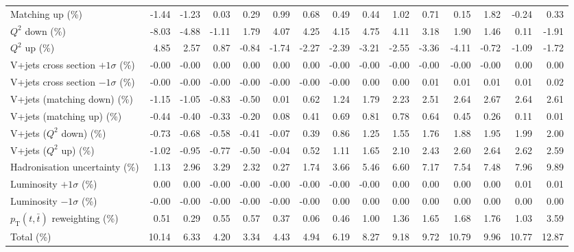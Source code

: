 \begin{table}[htbp]
{\begin{tabular}{lrrrrrrrrrrrrrr}
Matching up (\%) & -1.44 & -1.23 & 0.03 & 0.29 & 0.99 & 0.68 & 0.49 & 0.44 & 1.02 & 0.71 & 0.15 & 1.82 & -0.24 & 0.33 \\ 
$Q^{2}$ down (\%) & -8.03 & -4.88 & -1.11 & 1.79 & 4.07 & 4.25 & 4.15 & 4.75 & 4.11 & 3.18 & 1.90 & 1.46 & 0.11 & -1.91 \\ 
$Q^{2}$ up (\%) & 4.85 & 2.57 & 0.87 & -0.84 & -1.74 & -2.27 & -2.39 & -3.21 & -2.55 & -3.36 & -4.11 & -0.72 & -1.09 & -1.72 \\ 
V+jets cross section \ensuremath{+1\sigma} (\%) & -0.00 & -0.00 & 0.00 & 0.00 & 0.00 & 0.00 & -0.00 & -0.00 & -0.00 & -0.00 & -0.00 & -0.00 & 0.00 & 0.00 \\ 
V+jets cross section \ensuremath{-1\sigma} (\%) & -0.00 & -0.00 & -0.00 & -0.00 & -0.00 & -0.00 & -0.00 & 0.00 & 0.00 & 0.01 & 0.01 & 0.01 & 0.01 & 0.02 \\ 
V+jets (matching down) (\%) & -1.15 & -1.05 & -0.83 & -0.50 & 0.01 & 0.62 & 1.24 & 1.79 & 2.23 & 2.51 & 2.64 & 2.67 & 2.64 & 2.61 \\ 
V+jets (matching up) (\%) & -0.44 & -0.40 & -0.33 & -0.20 & 0.08 & 0.41 & 0.69 & 0.81 & 0.78 & 0.64 & 0.45 & 0.26 & 0.11 & 0.01 \\ 
V+jets ($Q^{2}$ down) (\%) & -0.73 & -0.68 & -0.58 & -0.41 & -0.07 & 0.39 & 0.86 & 1.25 & 1.55 & 1.76 & 1.88 & 1.95 & 1.99 & 2.00 \\ 
V+jets ($Q^{2}$ up) (\%) & -1.02 & -0.95 & -0.77 & -0.50 & -0.04 & 0.52 & 1.11 & 1.65 & 2.10 & 2.43 & 2.60 & 2.64 & 2.62 & 2.59 \\ 
Hadronisation uncertainty (\%) & 1.13 & 2.96 & 3.29 & 2.32 & 0.27 & 1.74 & 3.66 & 5.46 & 6.60 & 7.17 & 7.54 & 7.48 & 7.96 & 9.89 \\ 
Luminosity $+1\sigma$ (\%) & 0.00 & 0.00 & -0.00 & -0.00 & -0.00 & -0.00 & -0.00 & -0.00 & 0.00 & 0.00 & 0.00 & 0.00 & 0.01 & 0.01 \\ 
Luminosity $-1\sigma$ (\%) & -0.00 & -0.00 & -0.00 & -0.00 & -0.00 & -0.00 & 0.00 & 0.00 & 0.00 & 0.00 & 0.00 & 0.00 & 0.00 & 0.00 \\ 
$p_\mathrm{T}(t,\bar{t})$ reweighting (\%) & 0.51 & 0.29 & 0.55 & 0.57 & 0.37 & 0.06 & 0.46 & 1.00 & 1.36 & 1.65 & 1.68 & 1.76 & 1.03 & 3.59 \\ 
\hline 
Total (\%) & 10.14  & 6.33  & 4.20  & 3.34  & 4.43  & 4.94  & 6.19  & 8.27  & 9.18  & 9.72  & 10.79  & 9.96  & 10.77  & 12.87 \\ 
\hline 
\end{tabular}
}
\end{table}
